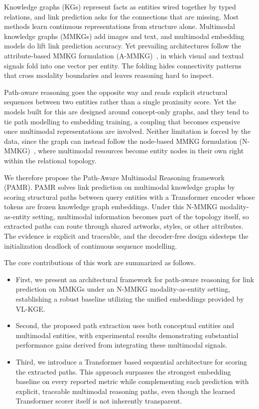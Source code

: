 \documentclass[runningheads]{llncs}
\begin{document}
Knowledge graphs (KGs) represent facts as entities wired together by typed relations, and link prediction asks for the connections that are missing. Most methods learn continuous representations from structure alone. Multimodal knowledge graphs (MMKGs) add images and text, and multimodal embedding models do lift link prediction accuracy. Yet prevailing architectures follow the attribute-based MMKG formulation (A-MMKG)~\cite{zhu2024multimodal}, in which visual and textual signals fold into one vector per entity. The folding hides connectivity patterns that cross modality boundaries and leaves reasoning hard to inspect.

Path-aware reasoning goes the opposite way and reads explicit structural sequences between two entities rather than a single proximity score. Yet the models built for this are designed around concept-only graphs, and they tend to tie path modelling to embedding training, a coupling that becomes expensive once multimodal representations are involved. Neither limitation is forced by the data, since the graph can instead follow the node-based MMKG formulation (N-MMKG)~\cite{zhu2024multimodal,liang2024survey}, where multimodal resources become entity nodes in their own right within the relational topology.

We therefore propose the Path-Aware Multimodal Reasoning framework (PAMR). PAMR solves link prediction on multimodal knowledge graphs by scoring structural paths between query entities with a Transformer encoder whose tokens are frozen knowledge graph embeddings. Under this N-MMKG modality-as-entity setting, multimodal information becomes part of the topology itself, so extracted paths can route through shared artworks, styles, or other attributes. The evidence is explicit and traceable, and the decoder-free design sidesteps the initialization deadlock of continuous sequence modelling.

The core contributions of this work are summarized as follows.

\begin{itemize}
  \item First, we present an architectural framework for path-aware reasoning for link prediction on MMKGs under an N-MMKG modality-as-entity setting, establishing a robust baseline utilizing the unified embeddings provided by VL-KGE.
  \item Second, the proposed path extraction uses both conceptual entities and multimodal entities, with experimental results demonstrating substantial performance gains derived from integrating these multimodal signals.
  \item Third, we introduce a Transformer based sequential architecture for scoring the extracted paths. This approach surpasses the strongest embedding baseline on every reported metric while complementing each prediction with explicit, traceable multimodal reasoning paths, even though the learned Transformer scorer itself is not inherently transparent.
\end{itemize}
\end{document}
